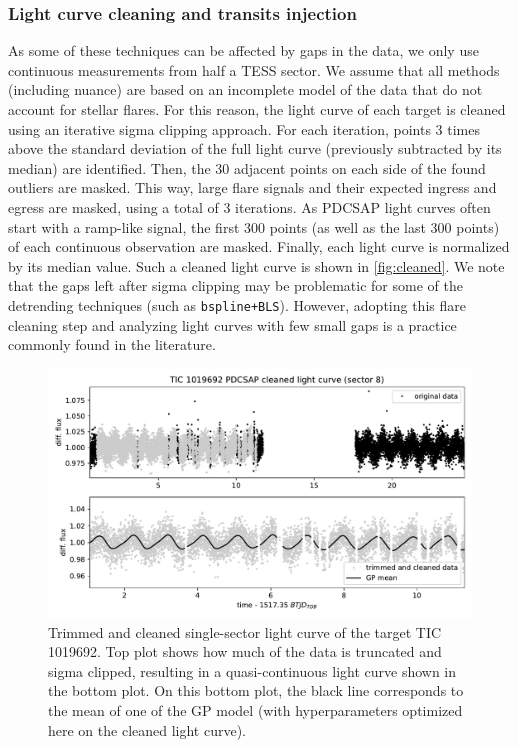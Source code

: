 \documentclass[modern]{aastex631}
\begin{document}
\subsubsection*{Light curve cleaning and transits injection}

As some of these techniques can be affected by gaps in the data, we only use continuous measurements from half a TESS sector. We assume that all methods (including nuance) are based on an incomplete model of the data that do not account for stellar flares. For this reason, the light curve of each target is cleaned using an iterative sigma clipping approach. For each iteration, points 3 times above the standard deviation of the full light curve (previously subtracted by its median) are identified. Then, the 30 adjacent points on each side of the found outliers are masked. This way, large flare signals and their expected ingress and egress are masked, using a total of 3 iterations. As PDCSAP light curves often start with a ramp-like signal, the first 300 points (as well as the last 300 points) of each continuous observation are masked. Finally, each light curve is normalized by its median value. Such a cleaned light curve is shown in \autoref{fig:cleaned}. We note that the gaps left after sigma clipping may be problematic for some of the detrending techniques (such as \texttt{bspline+BLS}). However, adopting this flare cleaning step and analyzing light curves with few small gaps is a practice commonly found in the literature.
\begin{figure}[H]
    \centering
    \includegraphics[width=\linewidth]{../workflows/tess_injection_recovery/figures/cleaned/1019692.pdf}
    \caption{Trimmed and cleaned single-sector light curve of the target TIC 1019692. Top plot shows how much of the data is truncated and sigma clipped, resulting in a quasi-continuous light curve shown in the bottom plot. On this bottom plot, the black line corresponds to the mean of one of the GP model (with hyperparameters optimized here on the cleaned light curve).}
    \label{fig:cleaned}
\end{figure}
\end{document}
